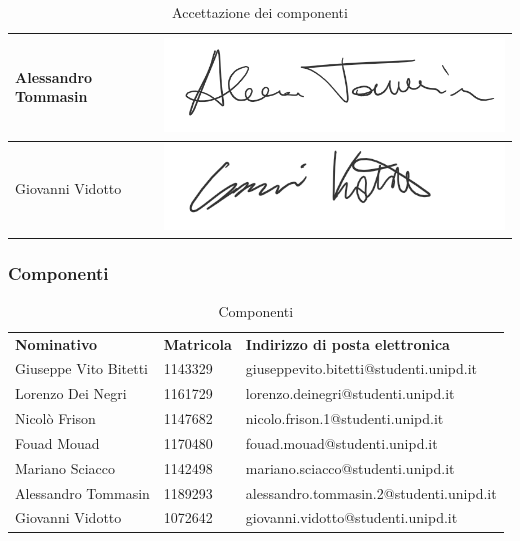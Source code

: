 \begin{table}[h!]
\begin{tabular}{|l|l|l|}
					Alessandro Tommasin & & \includegraphics[scale=0.6]{images/firme/alessandro} \\ \hline
					Giovanni Vidotto & & \includegraphics[scale=0.6]{images/firme/giovanni} \\ \hline
				\end{tabular}
				\caption{Accettazione dei componenti}
			\end{table}
			
		\subsubsection{Componenti}
			
			\begin{table}[h!]
				\centering
				\begin{tabular}{lll}
					\textbf{Nominativo} & \textbf{Matricola} & \textbf{Indirizzo di posta elettronica} \\
					Giuseppe Vito Bitetti & 1143329 & giuseppevito.bitetti@studenti.unipd.it \\
					Lorenzo Dei Negri & 1161729 & lorenzo.deinegri@studenti.unipd.it \\
					Nicolò Frison & 1147682 & nicolo.frison.1@studenti.unipd.it \\
					Fouad Mouad & 1170480 & fouad.mouad@studenti.unipd.it \\
					Mariano Sciacco & 1142498 & mariano.sciacco@studenti.unipd.it \\
					Alessandro Tommasin & 1189293 & alessandro.tommasin.2@studenti.unipd.it \\
					Giovanni Vidotto & 1072642 & giovanni.vidotto@studenti.unipd.it \\
				\end{tabular}
				\caption{Componenti}
			\end{table}
		
